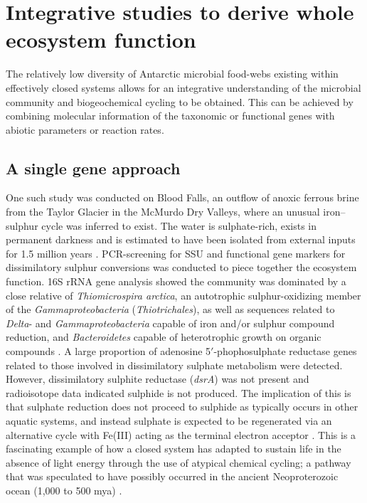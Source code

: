 

\section{Integrative studies to derive whole ecosystem function}
\label{sec:integrative}
The relatively low diversity of Antarctic microbial food-webs existing within effectively closed systems allows for an integrative understanding of the microbial community and biogeochemical cycling to be obtained. 
This can be achieved by combining molecular information of the taxonomic or functional genes with abiotic parameters or reaction rates.

\subsection{A single gene approach}
One such study was conducted on Blood Falls, an outflow of anoxic ferrous brine from the Taylor Glacier in the McMurdo Dry Valleys, where an unusual iron--sulphur cycle was inferred to exist. 
The water is sulphate-rich, exists in permanent darkness and is estimated to have been isolated from external inputs for 1.5 million years \cite{Mikucki2009}.
\ac{PCR}-screening for \ac{SSU} and functional gene markers for dissimilatory sulphur conversions was conducted to piece together the ecosystem function.  
16S rRNA gene analysis showed the community was dominated by a close relative of \emph{Thiomicrospira arctica}, an autotrophic sulphur-oxidizing member of the \emph{Gammaproteobacteria} (\emph{Thiotrichales}), as well as sequences related to \emph{Delta}- and \emph{Gammaproteobacteria} capable of iron and/or sulphur compound reduction, and \emph{Bacteroidetes} capable of heterotrophic growth on organic compounds \cite{Mikucki2007}.
A large proportion of adenosine 5$'$-phophosulphate reductase genes related to those involved in dissimilatory sulphate metabolism were detected. 
However, dissimilatory sulphite reductase (\emph{dsrA}) was not present and radioisotope data indicated sulphide is not produced. 
The implication of this is that sulphate reduction does not proceed to sulphide as typically occurs in other aquatic systems, and instead sulphate is expected to be regenerated via an alternative cycle with Fe(III) acting as the terminal electron acceptor \cite{Mikucki2009}. 
This is a fascinating example of how a closed system has adapted to sustain life in the absence of light energy through the use of atypical chemical cycling; a pathway that was speculated to have possibly occurred in the ancient Neoproterozoic ocean (1,000 to 500 mya) \cite{Mikucki2009}.

